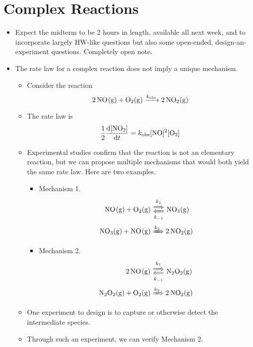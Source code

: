 \documentclass[../notes.tex]{subfiles}
\begin{document}
\section{Complex Reactions}
\begin{itemize}
    \item {}Expect the midterm to be 2 hours in length, available all next week, and to incorporate largely HW-like questions but also some open-ended, design-an-experiment questions. Completely open note.
    \item The rate law for a complex reaction does not imply a unique mechanism.
    \begin{itemize}
        \item Consider the reaction
        \begin{equation*}
            \ce{2NO(g) + O2(g) ->[$k_\text{obs}$] 2NO2(g)}
        \end{equation*}
        \item The rate law is
        \begin{equation*}
            \frac{1}{2}\dv{[\ce{NO2}]}{t} = k_\text{obs}[\ce{NO}]^2[\ce{O2}]
        \end{equation*}
        \item Experimental studies confirm that the reaction is not an elementary reaction, but we can propose multiple mechanisms that would both yield the same rate law. Here are two examples.
        \begin{itemize}
            \item Mechanism 1.
            \begin{align*}
                \ce{NO(g) + O2(g)} &\Longleftrightarrows[k_1][k_{-1}] \ce{NO3(g)}\\
                \ce{NO3(g) + NO(g)} &\xRightarrow{k_2} \ce{2 NO2(g)}
            \end{align*}
            \item Mechanism 2.
            \begin{align*}
                \ce{2NO(g)} &\Longleftrightarrows[k_1][k_{-1}] \ce{N2O2(g)}\\
                \ce{N2O2(g) + O2(g)} &\xRightarrow{k_2} \ce{2 NO2(g)}
            \end{align*}
        \end{itemize}
        \item One experiment to design is to capture or otherwise detect the intermediate species.
        \item Through such an experiment, we can verify Mechanism 2.

\end{itemize}
\end{itemize}
\end{document}
